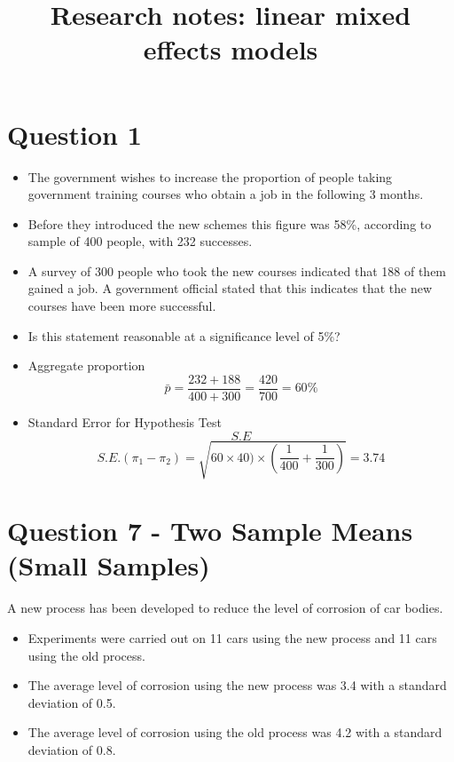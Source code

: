 \documentclass[12pt, a4paper]{report}
\title{Research notes: linear mixed effects models}
\author{ } \date{ }
\theoremstyle{plain}
\theoremstyle{definition}
\theoremstyle{remark}
\begin{document}
\section*{Question 1}
\begin{itemize}
\item The government wishes to increase the proportion of people taking government training courses who obtain a job in the following 3 months. \item Before they introduced the new schemes this figure was 58\%, according to sample of 400 people, with 232 successes. \item A survey of 300 people who took the new courses indicated that 188 of them gained a job. A government official stated that this indicates that the new courses have been more successful. \item Is this statement reasonable at a significance level of 5\%?
\end{itemize}


\begin{itemize}
\item Aggregate proportion
\[ \bar{p} = \frac{232 + 188}{400+300} = \frac{420}{700} =60\%\]
\item Standard Error for Hypothesis Test
\[S.E\]\[ S.E.(\pi_1 - \pi_2)  = \sqrt{60 \times 40) \times \left( \frac{1}{400} + \frac{1}{300}\right)}  = 3.74\]

\end{itemize}
\section*{Question 7 - Two Sample Means (Small Samples)}
A new process has been developed to reduce the level of corrosion of car bodies.
\begin{itemize}
\item Experiments were carried out on 11 cars using the new process and 11 cars using the old process. \item The average level of corrosion using the new process was 3.4 with a standard deviation of 0.5. \item The average level of corrosion using the old process was 4.2 with a standard deviation of 0.8. 
\end{itemize} 
\end{document}
